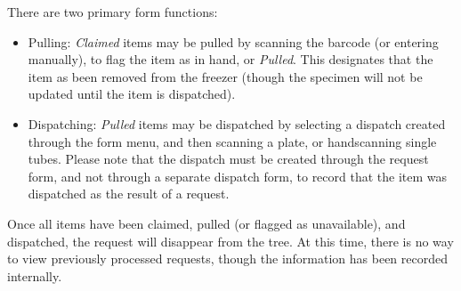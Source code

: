 There are two primary form functions:
\begin{itemize}
\item Pulling:  \emph{Claimed} items may be pulled by scanning the barcode (or entering manually), to flag the item as in hand, or \emph{Pulled}.  This designates that the item as been removed from the freezer (though the specimen will not be updated until the item is dispatched).  
\item Dispatching: \emph{Pulled} items may be dispatched by selecting a dispatch created through the form menu, and then scanning a plate, or handscanning single tubes. Please note that the dispatch must be created through the request form, and not through a separate dispatch form, to record that the item was dispatched as the result of a request.  
\end{itemize}
 
Once all items have been claimed, pulled (or flagged as unavailable), and dispatched, the request will disappear from the tree.  At this time, there is no way to view previously processed requests, though the information has been recorded internally.

